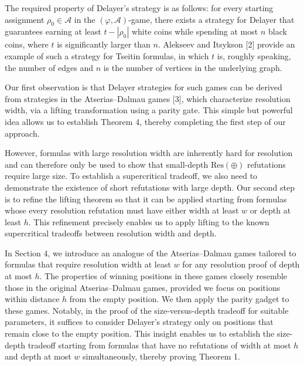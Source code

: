 \documentclass[10pt,a4paper]{article}
\begin{document}
The required property of Delayer’s strategy is as follows: for every starting assignment $\rho_{0}\in\mathcal{A}$ in the $(\varphi,\mathcal{A})$-game, there exists a strategy for Delayer that guarantees earning at least $t-|\rho_{0}|$ white coins while spending at most $n$ black coins, where $t$ is significantly larger than $n$. Alekseev and Itsykson [2] provide an example of such a strategy for Tseitin formulas, in which $t$ is, roughly speaking, the number of edges and $n$ is the number of vertices in the underlying graph.\par



Our first observation is that Delayer strategies for such games can be derived from strategies in the Atserias–Dalmau games [3], which characterize resolution width, via a lifting transformation using a parity gate. This simple but powerful idea allows us to establish Theorem 4, thereby completing the first step of our approach.\par



However, formulas with large resolution width are inherently hard for resolution and can therefore only be used to show that small-depth $\mathrm{Res}(\oplus)$ refutations require large size. To establish a supercritical tradeoff, we also need to demonstrate the existence of short refutations with large depth. Our second step is to refine the lifting theorem so that it can be applied starting from formulas whose every resolution refutation must have either width at least $w$ or depth at least $h$. This refinement precisely enables us to apply lifting to the known supercritical tradeoffs between resolution width and depth.\par



In Section 4, we introduce an analogue of the Atserias–Dalmau games tailored to formulas that require resolution width at least $w$ for any resolution proof of depth at most $h$. The properties of winning positions in these games closely resemble those in the original Atserias–Dalmau games, provided we focus on positions within distance $h$ from the empty position. We then apply the parity gadget to these games. Notably, in the proof of the size-versus-depth tradeoff for suitable parameters, it suffices to consider Delayer’s strategy only on positions that remain close to the empty position. This insight enables us to establish the size-depth tradeoff starting from formulas that have no refutations of width at most $h$ and depth at most $w$ simultaneously, thereby proving Theorem 1.\par
\end{document}
